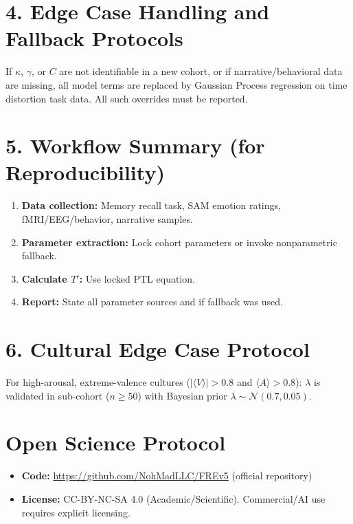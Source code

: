 \documentclass[12pt]{article}
\begin{document}
\section*{4. Edge Case Handling and Fallback Protocols}
\begin{tcolorbox}[colback=gray!10!white, colframe=gray!80!black, title=Nonparametric Override]
If $\kappa$, $\gamma$, or $C$ are not identifiable in a new cohort, or if narrative/behavioral data are missing, all model terms are replaced by Gaussian Process regression on time distortion task data. All such overrides must be reported.
\end{tcolorbox}

\section*{5. Workflow Summary (for Reproducibility)}
\begin{enumerate}
  \item \textbf{Data collection:} Memory recall task, SAM emotion ratings, fMRI/EEG/behavior, narrative samples.
  \item \textbf{Parameter extraction:} Lock cohort parameters or invoke nonparametric fallback.
  \item \textbf{Calculate $T'$:} Use locked PTL equation.
  \item \textbf{Report:} State all parameter sources and if fallback was used.
\end{enumerate}

\section*{6. Cultural Edge Case Protocol}
For high-arousal, extreme-valence cultures ($| \langle V \rangle | > 0.8$ and $\langle A \rangle > 0.8$):  
$\lambda$ is validated in sub-cohort ($n \geq 50$) with Bayesian prior $\lambda \sim \mathcal{N}(0.7, 0.05)$.

\section*{Open Science Protocol}
\begin{itemize}
    \item \textbf{Code:} \url{https://github.com/NohMadLLC/FREv5} (official repository)
    \item \textbf{License:} CC-BY-NC-SA 4.0 (Academic/Scientific). Commercial/AI use requires explicit licensing.
\end{itemize}
\end{document}
